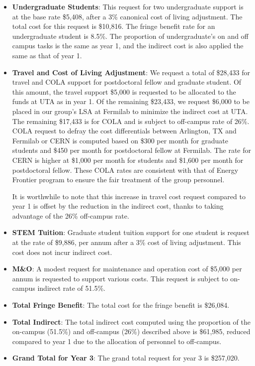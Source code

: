 \begin{enumerate}
\begin{itemize}
\item {{\bf Undergraduate Students}: This request for two undergraduate support is at the base rate \$5,408, after a 3\% canonical cost of living adjustment.  The total cost for this request is \$10,816.  The fringe benefit rate for an undergraduate student is 8.5\%.  The proportion of undergraduate’s on and off campus tasks is the same as year 1, and the indirect cost is also applied the same as that of year 1.}

\item{{\bf Travel and Cost of Living Adjustment}: We request a total of \$28,433 for travel and COLA support for postdoctoral fellow and graduate student.   Of this amount, the travel support \$5,000 is requested to be allocated to the funds at UTA as in year 1.  Of the remaining \$23,433, we request \$6,000 to be placed in our group’s LSA at Fermilab to minimize the indirect cost at UTA.   The remaining \$17,433 is for COLA and is subject to off-campus rate of 26\%.  COLA request to defray the cost differentials between Arlington, TX and Fermilab or CERN is computed based on \$300 per month for graduate students and \$450 per month for postdoctoral fellow at Fermilab.  The rate for CERN is higher at \$1,000 per month for students and \$1,600 per month for postdoctoral fellow.  These COLA rates are consistent with that of Energy Frontier program to ensure the fair treatment of the group personnel.  

It is worthwhile to note that this increase in travel cost request compared to year 1 is offset by the reduction in the indirect cost, thanks to taking advantage of the 26\% off-campus rate.}

\item {{\bf STEM Tuition}: Graduate student tuition support for one student is request at the rate of \$9,886, per annum after a 3\% cost of living adjustment.  This cost does not incur indirect cost.}

\item {{\bf M\&O}: A modest request for maintenance and operation cost of \$5,000 per annum is requested to support various costs.   This request is subject to on-campus indirect rate of 51.5\%.}

\item {{\bf Total Fringe Benefit}: The total cost for the fringe benefit is \$26,084.}

\item {{\bf Total Indirect}: The total indirect cost computed using the proportion of the on-campus (51.5\%) and off-campus (26\%) described above is \$61,985, reduced compared to year 1 due to the allocation of personnel to off-campus.}

\item {{\bf Grand Total for Year 3}: The grand total request for year 3 is \$257,020.}

\end{itemize}
\end{enumerate}

